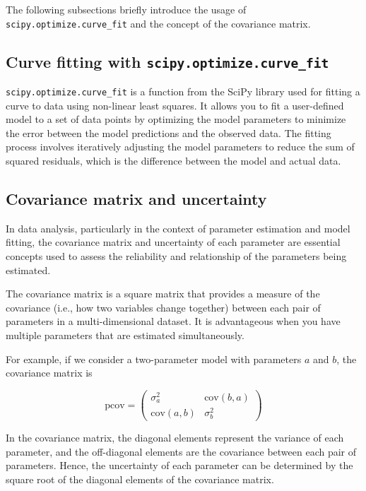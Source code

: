 \documentclass[12pt,a4paper]{article}
\begin{document}
\begin{CJK}{UTF8}{bkai}
The following subsections briefly introduce the usage of \texttt{scipy.optimize.curve\_fit} and the concept of the covariance matrix.

\subsection{Curve fitting with \texttt{scipy.optimize.curve\_fit}}
\hfill

\texttt{scipy.optimize.curve\_fit} is a function from the SciPy library used for fitting a curve to data using non-linear least squares. It allows you to fit a user-defined model to a set of data points by optimizing the model parameters to minimize the error between the model predictions and the observed data. The fitting process involves iteratively adjusting the model parameters to reduce the sum of squared residuals, which is the difference between the model and actual data.



\subsection{Covariance matrix and uncertainty}
\hfill

In data analysis, particularly in the context of parameter estimation and model fitting, the covariance matrix and uncertainty of each parameter are essential concepts used to assess the reliability and relationship of the parameters being estimated.

The covariance matrix is a square matrix that provides a measure of the covariance (i.e., how two variables change together) between each pair of parameters in a multi-dimensional dataset. It is advantageous when you have multiple parameters that are estimated simultaneously.

For example, if we consider a two-parameter model with parameters $a$ and $b$, the covariance matrix is

\begin{equation}
    \text{pcov} = 
    \begin{pmatrix} 
    \sigma_a^2 & \text{cov}(b, a) \\
    \text{cov}(a, b) & \sigma_b^2 
    \end{pmatrix}
\end{equation}

In the covariance matrix,  the diagonal elements represent the variance of each parameter, and the off-diagonal elements are the covariance between each pair of parameters. Hence, the uncertainty of each parameter can be determined by the square root of the diagonal elements of the covariance matrix.


\end{CJK}
\end{document}

